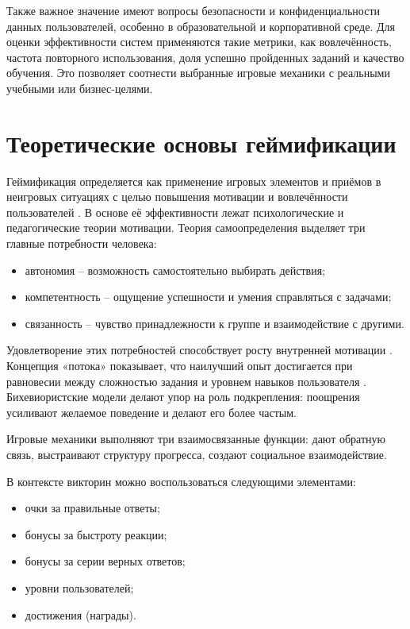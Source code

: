 \documentclass[14pt,a4paper]{extreport}
\begin{document}
Также важное значение имеют вопросы безопасности и конфиденциальности данных пользователей, особенно в образовательной и корпоративной среде. Для оценки эффективности систем применяются такие метрики, как вовлечённость, частота повторного использования, доля успешно пройденных заданий и качество обучения. Это позволяет соотнести выбранные игровые механики с реальными учебными или бизнес-целями.

\section{Теоретические основы геймификации}
Геймификация определяется как применение игровых элементов и приёмов в неигровых ситуациях с целью повышения мотивации и вовлечённости пользователей \cite{csikszentmihalyi1990,deterding2011,ryan2000}. В основе её эффективности лежат психологические и педагогические теории мотивации. Теория самоопределения выделяет три главные потребности человека:
\begin{itemize}
    \item автономия -- возможность самостоятельно выбирать действия;
    \item компетентность -- ощущение успешности и умения справляться с задачами;
    \item связанность -- чувство принадлежности к группе и взаимодействие с другими.
\end{itemize}

Удовлетворение этих потребностей способствует росту внутренней мотивации \cite{ryan2000}. Концепция «потока» показывает, что наилучший опыт достигается при равновесии между сложностью задания и уровнем навыков пользователя \cite{csikszentmihalyi1990}. Бихевиористские модели делают упор на роль подкрепления: поощрения усиливают желаемое поведение и делают его более частым.

Игровые механики выполняют три взаимосвязанные функции: дают обратную связь, выстраивают структуру прогресса, создают социальное взаимодействие.

В контексте викторин можно воспользоваться следующими элементами:
\begin{itemize}
    \item очки за правильные ответы;
    \item бонусы за быстроту реакции;
    \item бонусы за серии верных ответов;
    \item уровни пользователей;
    \item достижения (награды).
\end{itemize}
\end{document}
